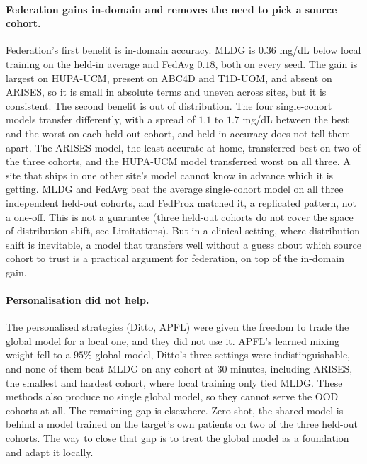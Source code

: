 \documentclass[10pt,letterpaper]{article}
\begin{document}
\paragraph{Federation gains in-domain and removes the need to pick a source
cohort.} Federation's first benefit is in-domain accuracy. MLDG is $0.36$
mg/dL below local training on the held-in average and FedAvg $0.18$, both on
every seed. The gain is largest on HUPA-UCM, present on ABC4D and T1D-UOM,
and absent on ARISES, so it is small in absolute terms and uneven across
sites, but it is consistent. The second benefit is out of distribution. The
four single-cohort models transfer differently, with a spread of $1.1$ to
$1.7$ mg/dL between the best and the worst on each held-out cohort, and
held-in accuracy does not tell them apart. The ARISES model, the least
accurate at home, transferred best on two of the three cohorts, and the
HUPA-UCM model transferred worst on all three. A site that ships in one other
site's model cannot know in advance which it is getting. MLDG and FedAvg beat
the average single-cohort model on all three independent held-out cohorts,
and FedProx matched it, a replicated pattern, not a one-off. This is not a guarantee (three held-out cohorts do
not cover the space of distribution shift, see Limitations). But in a
clinical setting, where distribution shift is inevitable, a model that
transfers well without a guess about which source cohort to trust is a
practical argument for federation, on top of the in-domain gain.

\paragraph{Personalisation did not help.} The personalised strategies
(Ditto, APFL) were given the freedom to trade the global model for a local
one, and they did not use it. APFL's learned mixing weight fell to a $95\%$
global model, Ditto's three settings were indistinguishable, and none of
them beat MLDG on any cohort at 30 minutes, including ARISES, the smallest
and hardest cohort, where local training only tied MLDG. These methods also
produce no single global model, so they cannot serve the OOD cohorts at all.
The remaining gap is elsewhere. Zero-shot, the shared model is behind a
model trained on the target's own patients on two of the three held-out
cohorts. The way to close that gap is to treat the global model as a
foundation and adapt it locally.
\end{document}
